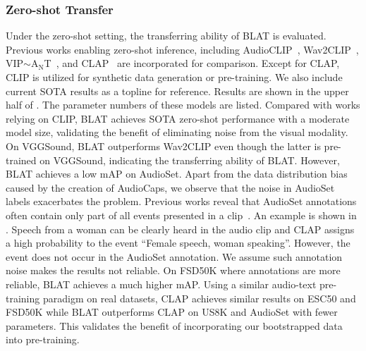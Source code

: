 \documentclass[sigconf]{acmart}
\begin{document}
\subsubsection{Zero-shot Transfer}
\label{subsubsec:zero_shot_transfer}
Under the zero-shot setting, the transferring ability of BLAT is evaluated.
Previous works enabling zero-shot inference, including AudioCLIP~\cite{guzhov2022audioclip}, Wav2CLIP~\cite{wu2022wav2clip}, VIP$\sim$A$_\text{N}$T~\cite{zhao2022connecting}, and CLAP~\cite{elizalde2022clap} are incorporated for comparison.
Except for CLAP, CLIP is utilized for synthetic data generation or pre-training.
We also include current SOTA results as a topline for reference.
Results are shown in the upper half of .
The parameter numbers of these models are listed.
Compared with works relying on CLIP, BLAT achieves SOTA zero-shot performance with a moderate model size, validating the benefit of eliminating noise from the visual modality.
On VGGSound, BLAT outperforms Wav2CLIP even though the latter is pre-trained on VGGSound, indicating the transferring ability of BLAT.
However, BLAT achieves a low mAP on AudioSet.
Apart from the data distribution bias caused by the creation of AudioCaps, we observe that the noise in AudioSet labels exacerbates the problem.
Previous works reveal that AudioSet annotations often contain only part of all events presented in a clip~\cite{gong2021psla}.
An example is shown in .
Speech from a woman can be clearly heard in the audio clip and CLAP assigns a high probability to the event ``Female speech, woman speaking''.
However, the event does not occur in the AudioSet annotation.
We assume such annotation noise makes the results not reliable.
On FSD50K where annotations are more reliable, BLAT achieves a much higher mAP.
Using a similar audio-text pre-training paradigm on real datasets, CLAP achieves similar results on ESC50 and FSD50K while BLAT outperforms CLAP on US8K and AudioSet with fewer parameters.
This validates the benefit of incorporating our bootstrapped data into pre-training.
\end{document}
